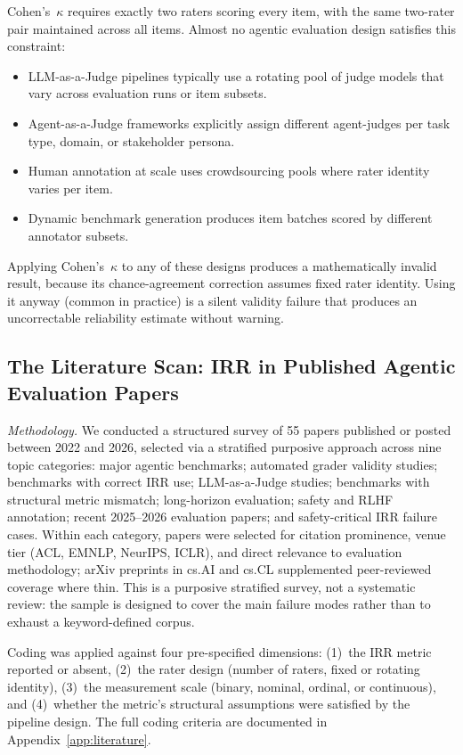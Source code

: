 \documentclass[preprint,12pt]{elsarticle}
\newcommand{\ck}{Cohen's~$\kappa$}
\begin{document}
\ck{} requires exactly two raters scoring every item, with the same two-rater pair
maintained across all items. Almost no agentic evaluation design satisfies this
constraint:

\begin{itemize}
  \item LLM-as-a-Judge pipelines typically use a rotating pool of judge models that
    vary across evaluation runs or item subsets.
  \item Agent-as-a-Judge frameworks \citep{zhuge2025} explicitly assign different
    agent-judges per task type, domain, or stakeholder persona.
  \item Human annotation at scale uses crowdsourcing pools where rater identity
    varies per item.
  \item Dynamic benchmark generation produces item batches scored by different
    annotator subsets.
\end{itemize}

Applying \ck{} to any of these designs produces a mathematically invalid result,
because its chance-agreement correction assumes fixed rater identity. Using it
anyway (common in practice) is a silent validity failure that produces an
uncorrectable reliability estimate without warning.

\subsection{The Literature Scan: IRR in Published Agentic Evaluation Papers}
\label{sec:scan}

\textit{Methodology.} We conducted a structured survey of 55 papers published or
posted between 2022 and 2026, selected via a stratified purposive approach across
nine topic categories: major agentic benchmarks; automated grader validity studies;
benchmarks with correct IRR use; LLM-as-a-Judge studies; benchmarks with structural
metric mismatch; long-horizon evaluation; safety and RLHF annotation; recent
2025--2026 evaluation papers; and safety-critical IRR failure cases. Within each
category, papers were selected for citation prominence, venue tier (ACL, EMNLP,
NeurIPS, ICLR), and direct relevance to evaluation methodology; arXiv preprints in
cs.AI and cs.CL supplemented peer-reviewed coverage where thin. This is a purposive
stratified survey, not a systematic review: the sample is designed to cover the main
failure modes rather than to exhaust a keyword-defined corpus.

Coding was applied against four pre-specified dimensions: (1)~the IRR metric reported
or absent, (2)~the rater design (number of raters, fixed or rotating identity),
(3)~the measurement scale (binary, nominal, ordinal, or continuous), and (4)~whether
the metric's structural assumptions were satisfied by the pipeline design.
The full coding criteria are documented in Appendix~\ref{app:literature}.
\end{document}
